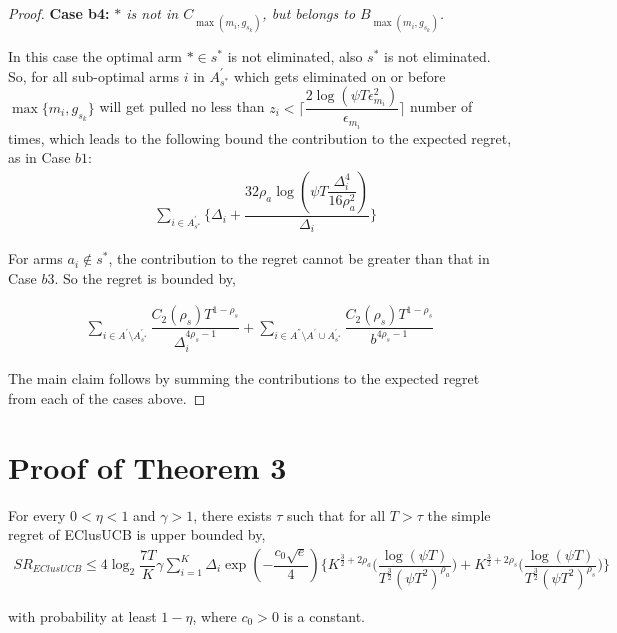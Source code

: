 \begin{proof}
 
\textbf{Case b4:} \textit{${*}$ is not in $C_{\max(m_{i},g_{s_{k}})}$, but belongs to $B_{\max(m_{i},g_{s_{k}})}$.}

In this case the optimal arm ${*}\in s^{*}$ is not eliminated, also $s^{*}$ is not eliminated. So, for all sub-optimal arms $i$ in $A_{s^*}^{'}$ which gets eliminated on or before $\max \lbrace m_{i},g_{s_{k}} \rbrace$ will get pulled no less than $z_{i} < \bigg\lceil\dfrac{2\log{(\psi T\epsilon_{m_{i}}^{2})}}{\epsilon_{m_{i}}}\bigg\rceil$ number of times, which leads to the following bound the contribution to the expected regret, as in Case $b1$:
% 
\begin{align*}
 &\sum_{i\in A_{s^*}^{'}}\bigg\lbrace \Delta_{i}+\dfrac{32\rho_{a}\log{(\psi T\dfrac{\Delta_{i}^{4}}{16\rho_{a}^{2}})}}{\Delta_{i}} \bigg\rbrace 
\end{align*} 

For arms $a_i \notin s^*$, the contribution to the regret cannot be greater than that in Case $b3$. So the regret is bounded by,

\begin{align*}
\sum_{i\in A^{'}\setminus A_{s^*}^{'}}\dfrac{C_{2}(\rho_{s})T^{1-\rho_{s}}}{\Delta_{i}^{4\rho_{s}-1}} +\sum_{i\in A^{''}\setminus A^{'} \cup A_{s^*}^{'}}\dfrac{C_{2}(\rho_{s})T^{1-\rho_{s}}}{b^{4\rho_{s}-1}}
\end{align*}




The main claim follows by summing the contributions to the expected regret from each of the cases above.
\end{proof}

\section{Proof of Theorem 3}
\label{App:SR_EClusUCB}
\begin{theorem}
\label{Result:Theorem:3}

For every $0<\eta <1$ and $\gamma > 1$, there exists $\tau$ such that for all $T>\tau$ the simple regret of EClusUCB is upper bounded by,
\begin{align*}
SR_{EClusUCB} \leq 4\log_{2}\dfrac{7T}{K}\gamma \sum_{i=1}^{K} \Delta_{i} \exp(-\dfrac{c_{0}\sqrt{e}}{4}) \bigg\lbrace K^{\frac{3}{2} +2\rho_{a}} \bigg(\dfrac{\log (\psi T )}{T^{\frac{3}{2}}(\psi T^2)^{\rho_{a}}}\bigg) + K^{\frac{3}{2} +2\rho_{s}} \bigg(\dfrac{\log (\psi T )}{T^{\frac{3}{2}}(\psi T^2)^{\rho_{s}}}\bigg) \bigg\rbrace
\end{align*}

with probability at least $1-\eta$, where $c_{0}>0$ is a constant.

\end{theorem}


